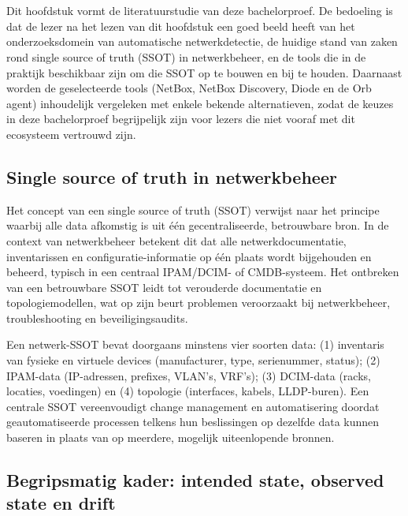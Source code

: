 \chapter{}%
\label{ch:stand-van-zaken}

Dit hoofdstuk vormt de literatuurstudie van deze bachelorproef. De bedoeling is dat de lezer na het lezen van dit hoofdstuk een goed beeld heeft van het onderzoeksdomein van automatische netwerkdetectie, de huidige stand van zaken rond single source of truth (SSOT) in netwerkbeheer, en de tools die in de praktijk beschikbaar zijn om die SSOT op te bouwen en bij te houden. Daarnaast worden de geselecteerde tools (NetBox, NetBox Discovery, Diode en de Orb agent) inhoudelijk vergeleken met enkele bekende alternatieven, zodat de keuzes in deze bachelorproef begrijpelijk zijn voor lezers die niet vooraf met dit ecosysteem vertrouwd zijn.

\section{Single source of truth in netwerkbeheer}

Het concept van een single source of truth (SSOT) verwijst naar het principe waarbij alle data afkomstig is uit \'e\'en gecentraliseerde, betrouwbare bron\autocite{NetBoxOSS}. In de context van netwerkbeheer betekent dit dat alle netwerkdocumentatie, inventarissen en configuratie-informatie op \'e\'en plaats wordt bijgehouden en beheerd, typisch in een centraal IPAM/DCIM- of CMDB-systeem\autocite{NetBoxPlanning}. Het ontbreken van een betrouwbare SSOT leidt tot verouderde documentatie en topologiemodellen, wat op zijn beurt problemen veroorzaakt bij netwerkbeheer, troubleshooting en beveiligingsaudits\autocite{NetBoxOSS}.

Een netwerk-SSOT bevat doorgaans minstens vier soorten data: (1) inventaris van fysieke en virtuele devices (manufacturer, type, serienummer, status); (2) IPAM-data (IP-adressen, prefixes, VLAN's, VRF's); (3) DCIM-data (racks, locaties, voedingen) en (4) topologie (interfaces, kabels, LLDP-buren). Een centrale SSOT vereenvoudigt change management en automatisering doordat geautomatiseerde processen telkens hun beslissingen op dezelfde data kunnen baseren in plaats van op meerdere, mogelijk uiteenlopende bronnen.

\section{Begripsmatig kader: intended state, observed state en drift}
\label{sec:intended-vs-observed}

